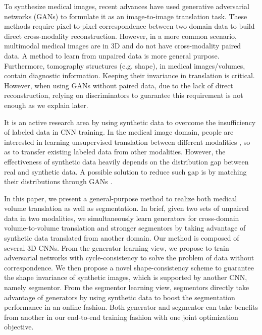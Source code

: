 \documentclass[10pt,twocolumn,letterpaper]{article}
\begin{document}
To synthesize medical images, recent advances \cite{nie2016medical,costa2017towards} have used generative adversarial networks (GANs) \cite{goodfellow2014generative} to formulate it as an image-to-image translation task. These methods require pixel-to-pixel correspondence between two domain data to build direct cross-modality reconstruction. 
However, in a more common scenario, multimodal medical images are in 3D and do not have cross-modality paired data.
A method to learn from unpaired data is more general purpose.
Furthermore, tomography structures (e.g. shape), in medical images/volumes, contain diagnostic information. Keeping their invariance in translation is critical. However, when using GANs without paired data, due to the lack of direct reconstruction,
relying on discriminators to guarantee this requirement is not enough as we explain later.


It is an active research area by using synthetic data to overcome the insufficiency of labeled data in CNN training. 
In the medical image domain, people are interested in learning unsupervised translation between different modalities \cite{kamnitsas2017unsupervised}, so as to transfer existing labeled data from other modalities. 
However, the effectiveness of synthetic data heavily depends on the distribution gap between real and synthetic data.
A possible solution to reduce such gap is by matching their distributions through GANs \cite{shrivastava2016learning,bousmalis2016unsupervised}.

In this paper, we present a general-purpose method to realize both medical volume translation as well as segmentation. In brief, given two sets of unpaired data in two modalities, we simultaneously learn generators for cross-domain volume-to-volume translation and stronger segmentors by taking advantage of synthetic data translated from another domain.
Our method is composed of several 3D CNNs. 
From the generator learning view, we propose to train adversarial networks with cycle-consistency \cite{zhu2017unpaired} to solve the problem of data without correspondence. 
We then propose a novel shape-consistency scheme to guarantee the shape invariance of synthetic images, which is supported by another CNN, namely segmentor. From the segmentor learning view, segmentors directly take advantage of generators by using synthetic data to boost the segmentation performance in an online fashion. Both generator and segmentor can take benefits from another in our end-to-end training fashion with one joint optimization objective.
\end{document}
